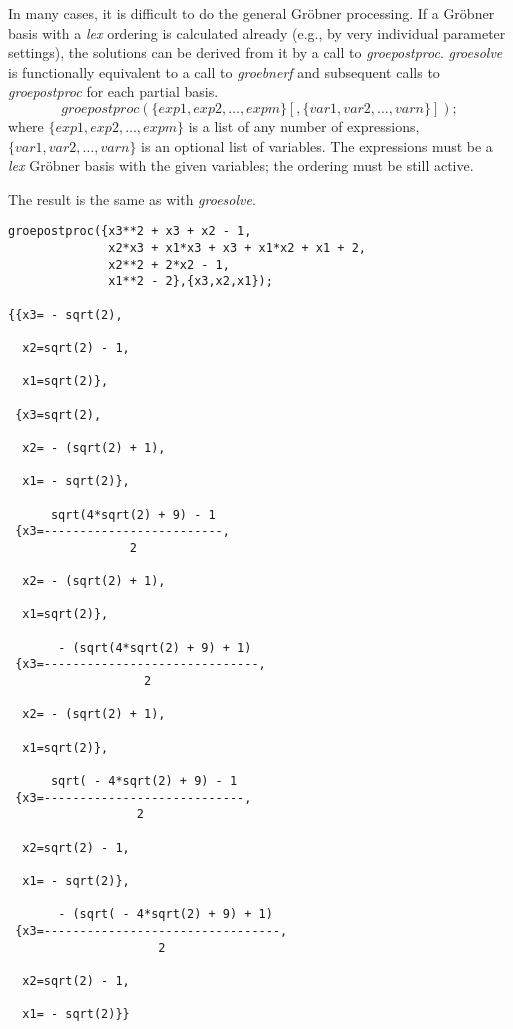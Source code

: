 \hypertarget{operator:GROEPOSTPROC}{}
In many cases, it is difficult to do the general Gr\"obner processing.
If a Gr\"obner basis with a {\it lex} ordering is calculated already (e.g.,
by very individual parameter settings), the solutions can be derived
from it by a call to \emph{groepostproc}. \emph{groesolve} is functionally
equivalent to a call to \emph{groebnerf} and subsequent calls to
\emph{groepostproc} for each partial basis.
\[
 groepostproc(\{exp1, exp2, \ldots , expm\}[,\{var1, var2, \ldots ,
varn\}]);
\]
where $\{exp1, exp2, \ldots , expm\}$ is a list of any number of
expressions, \linebreak[4] $\{var1, var2, \ldots, varn\}$ is an
optional list of variables. The expressions must be a {\it lex} Gr\"obner
basis with the given variables; the ordering must be still active.

The result is the same as with \emph{groesolve}.

\begin{verbatim}
groepostproc({x3**2 + x3 + x2 - 1,
              x2*x3 + x1*x3 + x3 + x1*x2 + x1 + 2,
              x2**2 + 2*x2 - 1,
              x1**2 - 2},{x3,x2,x1});

{{x3= - sqrt(2),

  x2=sqrt(2) - 1,

  x1=sqrt(2)},

 {x3=sqrt(2),

  x2= - (sqrt(2) + 1),

  x1= - sqrt(2)},

      sqrt(4*sqrt(2) + 9) - 1
 {x3=-------------------------,
                 2

  x2= - (sqrt(2) + 1),

  x1=sqrt(2)},

       - (sqrt(4*sqrt(2) + 9) + 1)
 {x3=------------------------------,
                   2

  x2= - (sqrt(2) + 1),

  x1=sqrt(2)},

      sqrt( - 4*sqrt(2) + 9) - 1
 {x3=----------------------------,
                  2

  x2=sqrt(2) - 1,

  x1= - sqrt(2)},

       - (sqrt( - 4*sqrt(2) + 9) + 1)
 {x3=---------------------------------,
                     2

  x2=sqrt(2) - 1,

  x1= - sqrt(2)}}
\end{verbatim}

